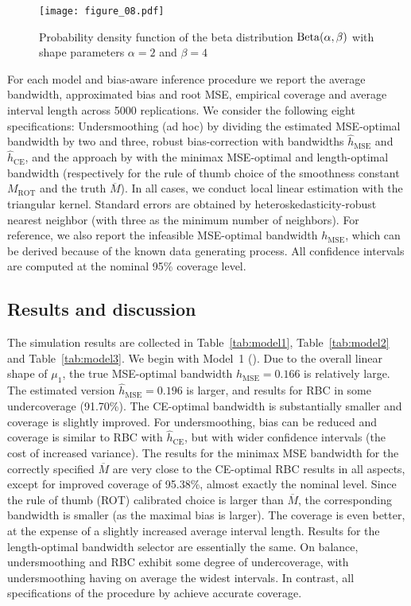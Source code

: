 \begin{figure}
	\centering
	\texttt{[image: figure\_08.pdf]}
	\caption{Probability density function of the beta distribution $\operatorname{Beta}(\alpha, \beta)$
			 with shape parameters $\alpha = 2$ and $\beta = 4$}
	\label{fig:beta_pdf}
\end{figure}

For each model and bias-aware inference procedure we report the average bandwidth,
approximated bias and root MSE, empirical coverage and average interval length across 5000 replications.
We consider the following eight specifications:
Undersmoothing (ad hoc) by dividing the estimated MSE-optimal bandwidth by two and three,
robust bias-correction with bandwidths $\hat{h}_{\text{MSE}}$ and $\hat{h}_{\text{CE}}$,
and the approach by \textcite{Armstrong_2020} with the minimax MSE-optimal and length-optimal bandwidth
(respectively for the rule of thumb choice of the smoothness constant $M_{\text{ROT}}$ and the truth $\overbar{M}$).
In all cases, we conduct local linear estimation with the triangular kernel.
Standard errors are obtained by heteroskedasticity-robust nearest neighbor (with three as the minimum number of neighbors).
For reference, we also report the infeasible MSE-optimal bandwidth $h_{\text{MSE}}$,
which can be derived because of the known data generating process.
All confidence intervals are computed at the nominal 95\% coverage level. 

\subsection{Results and discussion}

The simulation results are collected in Table~\ref{tab:model1}, Table~\ref{tab:model2} and Table~\ref{tab:model3}.
We begin with Model~1 (\cite{Lee_2008}).
Due to the overall linear shape of $\mu_{1}$, the true MSE-optimal bandwidth $h_{\text{MSE}} = 0.166$ is relatively large.
The estimated version $\hat{h}_{\text{MSE}} = 0.196$ is larger,
and results for RBC in some undercoverage (91.70\%).
The CE-optimal bandwidth is substantially smaller and coverage is slightly improved.
For undersmoothing, bias can be reduced and coverage is similar to RBC with $\hat{h}_{\text{CE}}$,
but with wider confidence intervals (the cost of increased variance).
The results for the minimax MSE bandwidth for the correctly specified $\overbar{M}$ are very close to the CE-optimal RBC results in all aspects,
except for improved coverage of 95.38\%, almost exactly the nominal level.
Since the rule of thumb (ROT) calibrated choice is larger than $\overbar{M}$,
the corresponding bandwidth is smaller (as the maximal bias is larger).
The coverage is even better, at the expense of a slightly increased average interval length.
Results for the length-optimal bandwidth selector are essentially the same.
On balance, undersmoothing and RBC exhibit some degree of undercoverage,
with undersmoothing having on average the widest intervals.
In contrast, all specifications of the procedure by \citeauthor{Armstrong_2020} achieve accurate coverage.      


